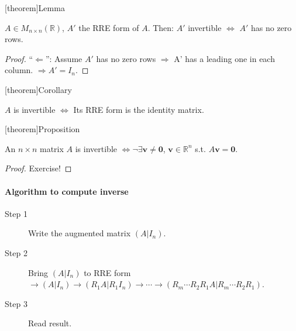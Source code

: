 \documentclass[12pt]{report}
\theoremstyle{definition}
\begin{document}
[theorem]{Lemma}
\begin{invertible A'}
    $A\in M_{n\times n}(\mathbb{R})$, $A'$ the RRE form of $A$. Then:
    $A'$ invertible $\iff$ $A'$ has no zero rows.
\end{invertible A'}

\begin{proof}
    ``$\Leftarrow$'': Assume $A'$ has no zero rows $\Rightarrow{}$ A' has a leading one in each column.
    $\Rightarrow{}A' = I_n$.
\end{proof}

[theorem]{Corollary}
\begin{invertible matrix is identity itself}
    $A$ is invertible $\iff$ Its RRE form is the identity matrix.
\end{invertible matrix is identity itself}

[theorem]{Proposition}
\begin{invertible and non-zero vector}\label{prop:4}
    An $n\times n$ matrix $A$ is invertible
    $\iff\neg\exists\mathbf{v}\neq\mathbf{0}$,
    $\mathbf{v}\in\mathbb{R}^{n}$ s.t. $A\mathbf{v}=\mathbf{0}$.
\end{invertible and non-zero vector}

\begin{proof}
    Exercise!
\end{proof} 

\paragraph{Algorithm to compute inverse}

\begin{description}
    \item[Step 1] Write the augmented matrix $(A|I_n)$.
    \item[Step 2] Bring $(A|I_n)$ to RRE form
        $\rightarrow{}(A|I_n)\rightarrow{}(R_1A|R_1 I_n)\rightarrow{}\cdots
        \rightarrow{}(R_m\cdots R_2 R_1 A|R_m\cdots R_2 R_1)$.
    \item[Step 3] Read result.
\end{description}
\end{document}

